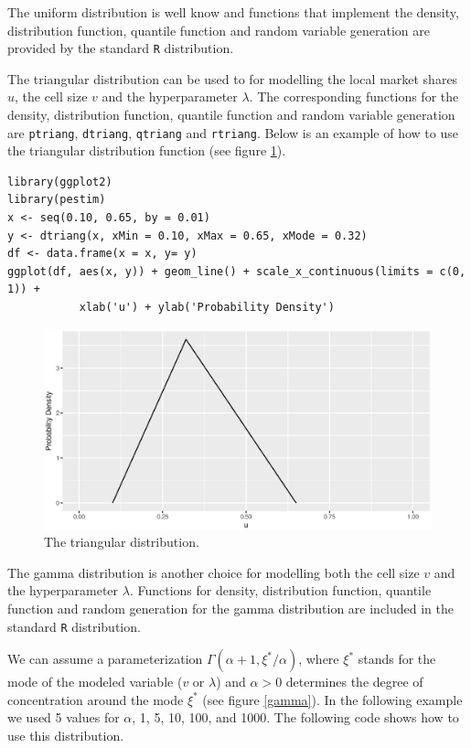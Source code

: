 \documentclass[12pt, a4paper]{article}
\begin{document}
The uniform distribution is well know and functions that implement the density, distribution function, 
quantile function and random variable generation are provided by the standard \texttt{R} distribution.

The triangular distribution can be used to for modelling the local market shares $u$, 
the cell size $v$ and the hyperparameter $\lambda$. The corresponding functions for 
the density, distribution function, quantile function and random variable generation
are \texttt{ptriang}, \texttt{dtriang}, \texttt{qtriang} and \texttt{rtriang}.
Below is an example of how to use the triangular distribution function (see figure \ref{triang}).

\begin{verbatim}
library(ggplot2)
library(pestim)
x <- seq(0.10, 0.65, by = 0.01)
y <- dtriang(x, xMin = 0.10, xMax = 0.65, xMode = 0.32)
df <- data.frame(x = x, y= y)
ggplot(df, aes(x, y)) + geom_line() + scale_x_continuous(limits = c(0, 1)) + 
           xlab('u') + ylab('Probability Density')	
\end{verbatim}

\begin{figure}
	\centering
	\includegraphics[scale=0.75]{triang.eps}
	\caption{The triangular distribution.}
	\label{triang}
\end{figure}

The gamma distribution is another choice for modelling both the cell size $v$ and the hyperparameter $\lambda$.
Functions for density, distribution function, quantile function and random generation for the gamma distribution  are included in the standard \texttt{R} distribution.

We can assume a parameterization $\Gamma(\alpha + 1, \xi^{*} / \alpha)$, where $\xi^{*}$ stands for the mode of the 
modeled variable ($v$ or $\lambda$) and $\alpha> 0$ determines the degree of concentration 
around the mode $\xi^{*}$ (see figure \ref{gamma}). In the following example we used 5 values for 
$\alpha$, 1, 5, 10, 100, and 1000. The following code shows how to use this distribution.
\end{document}
